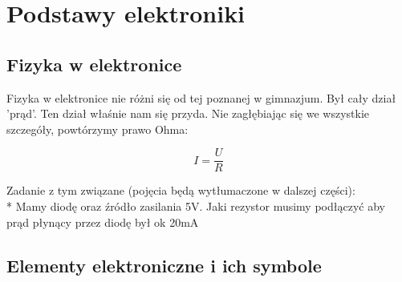 \documentclass[a4paper,12pt, twoside]{article}
\let\oldsection\section		%
\renewcommand\section{\clearpage\oldsection}%
\begin{document}
\cite{Introduction, Reference}



\section{Podstawy elektroniki}
 \subsection{Fizyka w elektronice}
	Fizyka w elektronice nie różni się od tej poznanej w gimnazjum. Był cały dział 'prąd'. Ten dział właśnie nam się przyda. Nie zagłębiając się we wszystkie szczegóły, powtórzymy prawo Ohma:
	\begin{center}
	\[
	I=\frac{U}{R}
	\]	
	\end{center}
Zadanie z tym związane (pojęcia będą wytłumaczone w dalszej części): \\* Mamy diodę oraz źródło zasilania 5V. Jaki rezystor musimy podłączyć aby prąd płynący przez diodę był ok 20mA %
	\subsection{Elementy elektroniczne i ich symbole}
\end{document}
